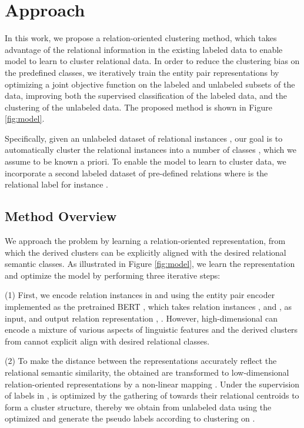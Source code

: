 \documentclass[11pt]{article}
\begin{document}
\section{Approach}
    In this work, we propose a relation-oriented clustering method, which takes advantage of the relational information in the existing labeled data to enable model to learn to cluster relational data. In order to reduce the clustering bias on the predefined classes, we iteratively train the entity pair representations by optimizing a joint objective function on the labeled and unlabeled subsets of the data, improving both the supervised classification of the labeled data, and the clustering of the unlabeled data. The proposed method is shown in Figure \ref{fig:model}.
    
    Specifically, given an unlabeled dataset  of relational instances , our goal is to automatically cluster the relational instances into a number of classes , which we assume to be known a priori. To enable the model to learn to cluster data, we incorporate a second labeled dataset of pre-defined relations  where  is the relational label for instance .
    \subsection{Method Overview}
        We approach the problem by learning a relation-oriented representation, from which the derived clusters can be explicitly aligned with the desired relational semantic classes.
As illustrated in Figure \ref{fig:model}, we learn the representation and optimize the model by performing three iterative steps:

        \noindent(1) First, we encode relation instances in  and  using the entity pair encoder implemented as the pretrained BERT \citep{DBLP:journals/corr/abs-1810-04805}, which takes relation instances , and , as input, and output relation representation , . However, high-dimensional  can encode a mixture of various aspects of linguistic features and the derived clusters from  cannot explicit align with desired relational classes. 

        \noindent(2) To make the distance between the representations accurately reflect the relational semantic similarity, the obtained  are transformed to low-dimensional relation-oriented representations  by a non-linear mapping . Under the supervision of labels  in ,  is optimized by the gathering of  towards their relational centroids to form a cluster structure, thereby we obtain  from unlabeled data using the optimized  and generate the pseudo labels  according to clustering on . 
\end{document}
